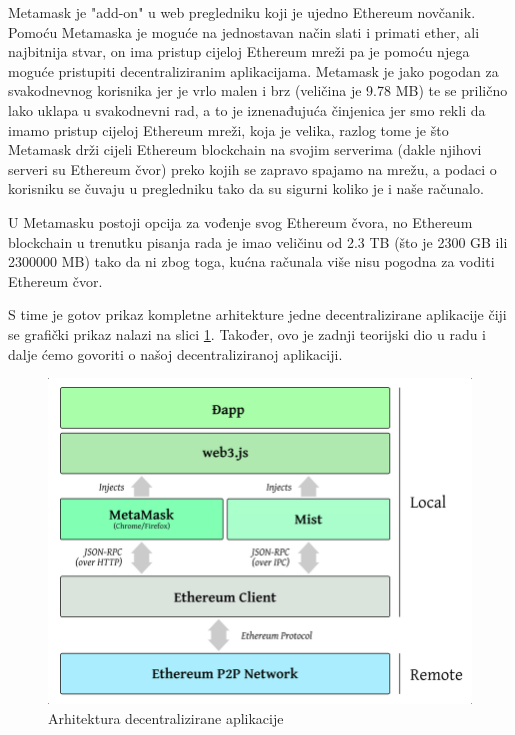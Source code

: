 \documentclass[a4paper,oneside,12pt]{memoir} %
\begin{document}
Metamask je "add-on" u web pregledniku koji je ujedno Ethereum novčanik. Pomoću Metamaska je moguće na jednostavan način slati i primati ether, ali najbitnija stvar, on ima pristup cijeloj Ethereum mreži pa je pomoću njega moguće pristupiti decentraliziranim aplikacijama. Metamask je jako pogodan za svakodnevnog korisnika jer je vrlo malen i brz (veličina je 9.78 MB) te se prilično lako uklapa u svakodnevni rad, a to je iznenađujuća činjenica jer smo rekli da imamo pristup cijeloj Ethereum mreži, koja je velika, razlog tome je što Metamask drži cijeli Ethereum blockchain na svojim serverima (dakle njihovi serveri su Ethereum čvor) preko kojih se zapravo spajamo na mrežu, a podaci o korisniku se čuvaju u pregledniku tako da su sigurni koliko je i naše računalo.

\begin{napomena}
U Metamasku postoji opcija za vođenje svog Ethereum čvora, no Ethereum blockchain u trenutku pisanja rada je imao veličinu od 2.3 TB (što je 2300 GB ili 2300000 MB) tako da ni zbog toga, kućna računala više nisu pogodna za voditi Ethereum čvor.
\end{napomena}

S time je gotov prikaz kompletne arhitekture jedne decentralizirane aplikacije čiji se grafički prikaz nalazi na slici \ref{fig:dapp}. Također, ovo je zadnji teorijski dio u radu i dalje ćemo govoriti o našoj decentraliziranoj aplikaciji.

\begin{figure}[H]
\centering
\includegraphics[scale=0.4]{dapp-architecture}
\caption{Arhitektura decentralizirane aplikacije}
\label{fig:dapp}
\end{figure}
\end{document}
